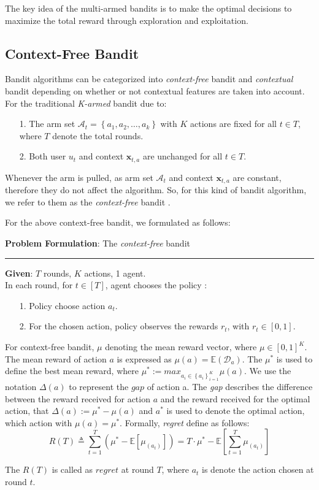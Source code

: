The key idea of the multi-armed bandits is to make the optimal decisions to maximize the total reward through exploration and exploitation.

\subsection{Context-Free Bandit}
Bandit algorithms can be categorized into \textit{context-free} bandit and \textit{contextual} bandit depending on whether or not contextual features are taken into account. For the traditional \textit{K-armed} bandit due to:
\begin{itemize}
    \item [1.] The arm set $\mathcal{A}_{t}=\left \{ a_{1},a_{2},\dots,a_{k}  \right \}$ with $K$ actions are fixed for all $t\in T$, where $T$ denote the total rounds.
    \item [2.] Both user $u_{t}$ and context $\mathbf{x}_{t, a}$ are unchanged for all $t\in T$.
\end{itemize}
Whenever the arm is pulled, as arm set $\mathcal{A}_{t}$ and context  $\mathbf{x}_{t, a}$ are constant, therefore they do not affect the algorithm. So, for this kind of bandit algorithm, we refer to them as the \textit{context-free} bandit \cite{context}.

For the above context-free bandit, we formulated as follows:
\begin{framed} 
\textbf{Problem Formulation}: The  \textit{context-free} bandit\\
\rule{\textwidth}{0.1mm}
\textbf{Given}: $T$ rounds, $K$ actions, 1 agent.\\
In each round, for $t\in [T]$, agent chooses the policy :
\begin{itemize}
    \item [1.] Policy choose action $a_{t}$.
    \item[2.] For the chosen action, policy observes the rewards $r_{t}$, with $r_{t}\in [0,1]$.
\end{itemize}
\end{framed} 

For context-free bandit, $\mu $ denoting the mean reward vector, where $\mu \in \left [ 0,1 \right ]^{K}$. The mean reward of action $a$ is expressed as $\mu(a) = \mathbb{E}(\mathcal D_{a})$. The $\mu^{*}$ is used to define the best mean reward, where $\mu^{*}:= max_{a_{i}\in \left \{ a_{i} \right \}_{i=1}^{K}}\mu (a)$. We use the notation $\Delta (a)$ to represent the $gap$ of action a. The \textit{gap} describes the difference between the reward received for action $a$ and the reward received for the optimal action, that $\Delta (a):= \mu ^{*}-\mu (a)$ and $a^{*}$ is used to denote the optimal action, which action with $\mu(a)=\mu^{*}$. Formally, \textit{regret} define as follows:
\begin{equation}
    R(T)\triangleq \sum_{t=1}^{T}(\mu^{*}-\mathbb{E}[\mu_{(a_{t})}])= T\cdot \mu^{*}-\mathbb{E}\left [ \sum_{t=1}^{T}\mu_{(a_{t})} \right ]
\end{equation}

The $R(T)$ is called as $regret$ at round $T$, where $a_{t}$ is denote the action chosen at round $t$.